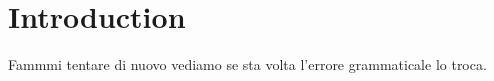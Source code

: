 
    \section{Introduction}
    Fammmi tentare di nuovo vediamo se sta volta l'errore grammaticale lo troca.
